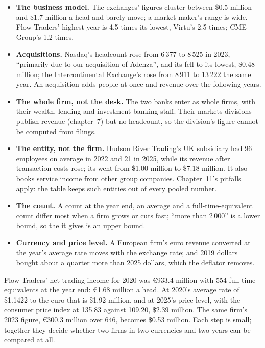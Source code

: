 \begin{itemize}
\item \textbf{The business model.} The exchanges' figures cluster between \$0.5 million and \$1.7 million a head and
barely move; a market maker's range is wide. Flow Traders' highest year is 4.5 times its lowest, Virtu's 2.5 times;
CME Group's 1.2 times.
\item \textbf{Acquisitions.} Nasdaq's headcount rose from 6\,377 to 8\,525 in 2023, ``primarily due to our acquisition
of Adenza'', and its  fell to its lowest, \$0.48 million; the Intercontinental Exchange's rose from
8\,911 to 13\,222 the same year. An acquisition adds people at once and revenue over the following years.
\item \textbf{The whole firm, not the desk.} The two banks enter as whole firms, with their wealth, lending and
investment banking staff. Their markets divisions publish revenue (chapter~7) but no headcount, so the division's
figure cannot be computed from filings.
\item \textbf{The entity, not the firm.} Hudson River Trading's UK subsidiary had 96 employees on average in 2022 and 21
in 2025, while its revenue after transaction costs rose; its  went from \$1.00 million to \$7.18 million.
It also books service income from other group companies. Chapter~11's pitfalls apply: the table keeps such entities out
of every pooled number.
\item \textbf{The count.} A count at the year end, an average and a full-time-equivalent count differ most when a firm
grows or cuts fast; ``more than 2\,000'' is a lower bound, so the  it gives is an upper bound.
\item \textbf{Currency and price level.} A European firm's euro revenue converted at the year's average rate moves with
the exchange rate; and 2019 dollars bought about a quarter more than 2025 dollars, which the deflator removes.
\end{itemize}

\begin{example}\label{ex:in:revenue-and-profit-across-the-industry:cell}
Flow Traders' net trading income for 2020 was \euro933.4 million with 554 full-time equivalents at the year end:
\euro1.68 million a head. At 2020's average rate of \$1.1422 to the euro that is \$1.92 million, and at 2025's price
level, with the consumer price index at 135.83 against 109.20, \$2.39 million. The same firm's 2023 figure, \euro300.3
million over 646, becomes \$0.53 million. Each step is small; together they decide whether two firms in two currencies
and two years can be compared at all.
\end{example}

